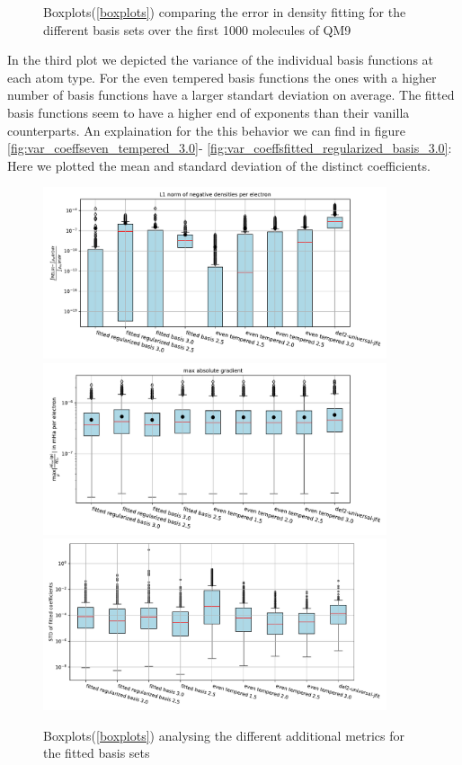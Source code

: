 {\begin{figure}
\caption{Boxplots(\ref{boxplots}) comparing the error in density fitting for the different basis sets over the first 1000 molecules of QM9} \label{fig:density_error_basis_sets}
\end{figure}
In the third plot we depicted the variance of the individual basis functions at each atom type. For the even tempered basis functions the ones with a higher number of basis functions have a larger standart deviation on average. The fitted basis functions seem
 to have a higher end of exponents than their vanilla counterparts. An explaination for the this behavior we can find in figure \ref{fig:var_coeffseven_tempered_3.0}- \ref{fig:var_coeffsfitted_regularized_basis_3.0}: Here we plotted the mean and standard deviation of the distinct coefficients.\\
    \begin{figure}
    \centering
    \includegraphics[width=0.9\textwidth]{chapters/results/results_images/L1_negative_densities_on_hartree+external_MOFDFT_for_different_basis_sets}
    \includegraphics[width=0.9\textwidth]{chapters/results/results_images/max_abs_gradient_on_hartree+external_MOFDFT_for_different_basis_sets}
    \includegraphics[width=0.9\textwidth]{chapters/results/results_images/var_basis_sets}
    \caption{Boxplots(\ref{boxplots}) analysing the different additional metrics for the fitted basis sets}
\end{figure}

}
